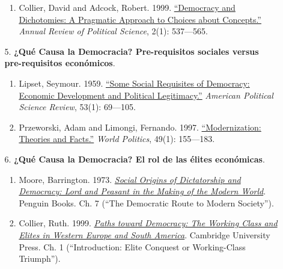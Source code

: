 \documentclass[letterpaper]{article}
\begin{document}
\begin{enumerate}
\begin{enumerate}
\begin{enumerate}
						\item Collier, David and Adcock, Robert. 1999. \href{https://github.com/hbahamonde/Ciencia_Politica_I/raw/master/Readings/Collier_Adcock.pdf}{``Democracy and Dichotomies: A Pragmatic Approach to Choices about Concepts.''} \emph{Annual Review of Political Science}, 2(1): 537---565. %
					\end{enumerate}
			
				\item[5.] {\bf ¿Qu\'e Causa la Democracia? Pre-requisitos sociales versus pre-requisitos econ\'omicos}.  
					\begin{enumerate}
						\item Lipset, Seymour. 1959. \href{https://github.com/hbahamonde/Ciencia_Politica_I/raw/master/Readings/Lipset.pdf}{``Some Social Requisites of Democracy: Economic Development and Political Legitimacy.''} \emph{American Political Science Review}, 53(1): 69---105.

						\item Przeworski, Adam and Limongi, Fernando. 1997. \href{https://github.com/hbahamonde/Ciencia_Politica_I/raw/master/Readings/Przeworski_Limongi_1997.pdf}{``Modernization: Theories and Facts.''} \emph{World Politics}, 49(1): 155---183.
						
					\end{enumerate}
				
				

				\item[6.] {\bf ¿Qu\'e Causa la Democracia? El rol de las \'elites econ\'omicas}. 
					\begin{enumerate}
						\item Moore, Barrington. 1973. \href{https://github.com/hbahamonde/Ciencia_Politica_I/raw/master/Readings/Moore.pdf}{\emph{Social Origins of Dictatorship and Democracy: Lord and Peasant in the Making of the Modern World}}. Penguin Books. Ch. 7 (``The Democratic Route to Modern Society'').
						
						\item Collier, Ruth. 1999. \href{https://github.com/hbahamonde/Ciencia_Politica_I/raw/master/Readings/Collier.pdf}{\emph{Paths toward Democracy: The Working Class and Elites in Western Europe and South America}}. Cambridge University Press. Ch. 1 (``Introduction: Elite Conquest or Working-Class Triumph'').
					\end{enumerate}


\end{enumerate}
\end{enumerate}
\end{document}
